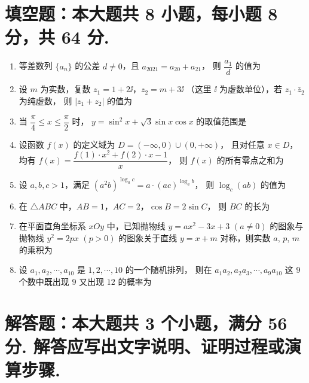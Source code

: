 \documentclass{chsmc}
\begin{document}
\section{填空题：本大题共 8 小题，每小题 8 分，共 64 分.}

\begin{enumerate}
  \item 等差数列 $\{a_n\}$ 的公差 $d \neq 0$，且 $a_{2021} = a_{20} + a_{21}$，
    则 $\dfrac{a_1}{d}$ 的值为 \blankline
  \item 设 $m$ 为实数，复数 $z_1 = 1 + 2\ii$，$z_2 = m + 3\ii$
    （这里 $\ii$ 为虚数单位），若 $z_1\cdot\bar{z}_2$ 为纯虚数，
    则 $|z_1 + z_2|$ 的值为 \blankline
  \item 当 $\dfrac{\pi}{4} \leqslant x \leqslant \dfrac{\pi}{2}$ 时，
    $y = \sin^2 x + \sqrt{3}\sin x\cos x$ 的取值范围是 \blankline
  \item 设函数 $f(x)$ 的定义域为 $D = (-\infty,0)\cup(0,+\infty)$，
    且对任意 $x \in D$，均有
    $f(x) = \dfrac{f(1)\cdot x^2 + f(2)\cdot x - 1}{x}$，
    则 $f(x)$ 的所有零点之和为 \blankline
  \item 设 $a, b, c > 1$，满足
    $(a^2 b)^{\log_a c} = a\cdot(ac)^{\log_a b}$，
    则 $\log_c(ab)$ 的值为 \blankline
  \item 在 $\triangle ABC$ 中，$AB = 1$，$AC = 2$，$\cos B = 2\sin C$，
    则 $BC$ 的长为 \blankline
  \item 在平面直角坐标系 $xOy$ 中，已知抛物线
    $y = ax^2 - 3x + 3$ $(a \neq 0)$ 的图象与抛物线 $y^2 = 2px$ $(p > 0)$
    的图象关于直线 $y = x + m$ 对称，则实数 $a$, $p$, $m$ 的乘积为 \blankline
  \item 设 $a_1, a_2, \cdots, a_{10}$ 是 $1, 2, \cdots, 10$ 的一个随机排列，
    则在 $a_1 a_2, a_2 a_3, \cdots, a_9 a_{10}$ 这 $9$ 个数中既出现 $9$
    又出现 $12$ 的概率为 \blankline
\end{enumerate}

\section{解答题：本大题共 3 个小题，满分 56 分. 解答应写出文字说明、证明过程或演算步骤.}
\end{document}
